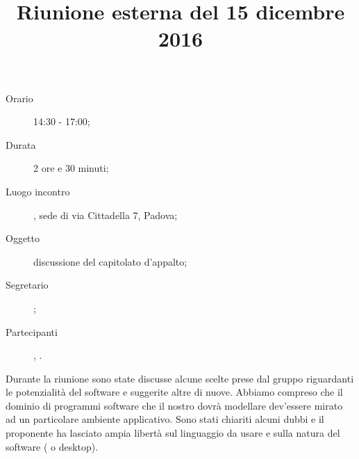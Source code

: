 


\author{\PB}
\supervisor{\MM}
\title{Riunione esterna del 15 dicembre 2016}



\maketitle

\begin{description}
	\item[Orario] 14:30 - 17:00;
	\item[Durata] 2 ore e 30 minuti;
	\item[Luogo incontro] \ZU, sede di via Cittadella 7, Padova;
	\item[Oggetto] discussione del capitolato d'appalto;
	\item[Segretario] \LS; 
	\item[Partecipanti] \GP, \ALL.
\end{description}

Durante la riunione sono state discusse alcune scelte prese dal gruppo riguardanti le potenzialità del software e suggerite altre di nuove. Abbiamo compreso che il dominio di programmi software che il nostro  dovrà modellare dev'essere mirato ad un particolare ambiente applicativo. Sono stati chiariti alcuni dubbi e il proponente ha lasciato ampia libertà sul linguaggio da usare e sulla natura del software ( o desktop).



